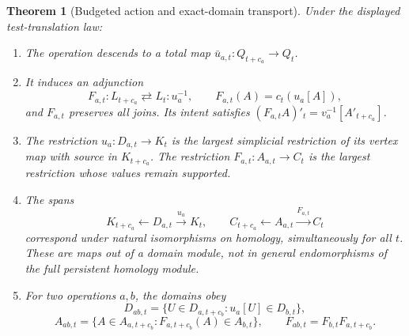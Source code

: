 \documentclass[11pt]{article}
\newtheorem{theorem}{Theorem}[section]
\theoremstyle{definition}\newtheorem{definition}[theorem]{Definition}
\theoremstyle{remark}\newtheorem{remark}[theorem]{Remark}
\begin{document}
\begin{theorem}[Budgeted action and exact-domain transport]
\label{thm:budget}
Under the displayed test-translation law:
\begin{enumerate}
\item The operation descends to a total map
$\bar u_{a,t}:Q_{t+c_a}\to Q_t$.
\item It induces an adjunction
\[
 F_{a,t}:L_{t+c_a}\rightleftarrows L_t:u_a^{-1},\qquad
 F_{a,t}(A)=c_t(u_a[A]),
\]
and $F_{a,t}$ preserves all joins. Its intent satisfies
$(F_{a,t}A)'_t=v_a^{-1}[A'_{t+c_a}]$.
\item The restriction $u_a:D_{a,t}\to K_t$ is the largest simplicial
restriction of its vertex map with source in $K_{t+c_a}$.
The restriction $F_{a,t}:A_{a,t}\to C_t$ is the largest restriction
whose values remain supported.
\item The spans
\[
 K_{t+c_a}\longleftarrow D_{a,t}\xrightarrow{u_a}K_t,
 \qquad
 C_{t+c_a}\longleftarrow A_{a,t}\xrightarrow{F_{a,t}}C_t
\]
correspond under natural isomorphisms on homology, simultaneously for all
$t$. These are maps out of a domain module, not in general endomorphisms
of the full persistent homology module.
\item For two operations $a,b$, the domains obey
\[
 D_{ab,t}=\{U\in D_{a,t+c_b}:u_a[U]\in D_{b,t}\},
\]
\[
 A_{ab,t}=\{A\in A_{a,t+c_b}:F_{a,t+c_b}(A)\in A_{b,t}\},
 \qquad F_{ab,t}=F_{b,t}F_{a,t+c_b}.
\]
\end{enumerate}
\end{theorem}
\end{document}
